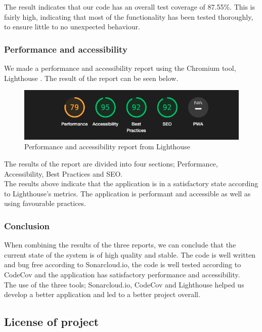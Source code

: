 \documentclass{article}
\begin{document}
The result indicates that our code has an overall test coverage of 87.55\%. This is fairly high, indicating that most of the functionality has been tested thoroughly, to ensure little to no unexpected behaviour. 

\subsubsection{Performance and accessibility}
We made a performance and accessibility report using the Chromium tool, Lighthouse \cite{lighthouse}. The result of the report can be seen below.
\begin{figure}[H]
    \centering
    \includegraphics[scale=0.50]{images/lighthouse.png}
    \caption{Performance and accessibility report from Lighthouse}
\end{figure}

The results of the report are divided into four sections; Performance, Accessibility, Best Practices and SEO.\\

The results above indicate that the application is in a satisfactory state according to Lighthouse's metrics. The application is performant and accessible as well as using favourable practices. 

\subsubsection{Conclusion}
When combining the results of the three reports, we can conclude that the current state of the system is of high quality and stable. The code is well written and bug free according to Sonarcloud.io, the code is well tested according to CodeCov and the application has satisfactory performance and accessibility.\\

The use of the three tools; Sonarcloud.io, CodeCov and Lighthouse helped us develop a better application and led to a better project overall.

\subsection{License of project}
\end{document}
